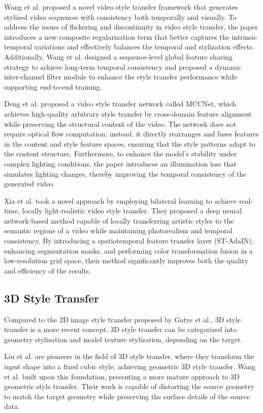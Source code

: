 \documentclass[preprint,12pt]{elsarticle}
\begin{document}
Wang et al.\citep{102wang2020consistent} proposed a novel video style transfer framework that generates stylized video sequences with consistency both temporally and visually. To address the issues of flickering and discontinuity in video style transfer, the paper introduces a new composite regularization term that better captures the intrinsic temporal variations and effectively balances the temporal and stylization effects. Additionally, Wang et al. designed a sequence-level global feature sharing strategy to achieve long-term temporal consistency and proposed a dynamic inter-channel filter module to enhance the style transfer performance while supporting end-to-end training.

Deng et al.\citep{97deng2021arbitrary} proposed a video style transfer network called MCCNet, which achieves high-quality arbitrary style transfer by cross-domain feature alignment while preserving the structural content of the video. The network does not require optical flow computation; instead, it directly rearranges and fuses features in the content and style feature spaces, ensuring that the style patterns adapt to the content structure. Furthermore, to enhance the model's stability under complex lighting conditions, the paper introduces an illumination loss that simulates lighting changes, thereby improving the temporal consistency of the generated video.

Xia et al.\citep{103xia2021real} took a novel approach by employing bilateral learning to achieve real-time, locally light-realistic video style transfer. They proposed a deep neural network-based method capable of locally transferring artistic styles to the semantic regions of a video while maintaining photorealism and temporal consistency. By introducing a spatiotemporal feature transfer layer (ST-AdaIN), enhancing segmentation masks, and performing color transformation fusion in a low-resolution grid space, their method significantly improves both the quality and efficiency of the results.
\subsection{3D Style Transfer}
Compared to the 2D image style transfer proposed by Gatys et al., 3D style transfer is a more recent concept.\citep{84liu2019cubic} 3D style transfer can be categorized into geometry stylization and model texture stylization, depending on the target.

Liu et al.\citep{84liu2019cubic} are pioneers in the field of 3D style transfer, where they transform the input shape into a fixed cubic style, achieving geometric 3D style transfer. Wang et al.\citep{85yifan2020neural} built upon this foundation, presenting a more mature approach to 3D geometric style transfer. Their work is capable of distorting the source geometry to match the target geometry while preserving the surface details of the source data.
\end{document}
